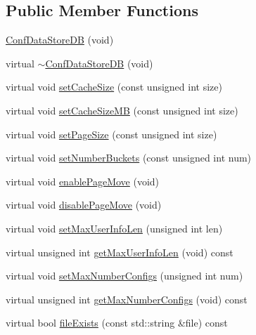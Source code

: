 \subsection*{Public Member Functions}
\begin{DoxyCompactItemize}
\item 
\mbox{\hyperlink{classFILEDB_1_1ConfDataStoreDB_a575d901daeccae08bcda5b2a60681e1b}{Conf\+Data\+Store\+DB}} (void)
\item 
virtual \mbox{\hyperlink{classFILEDB_1_1ConfDataStoreDB_a39b48750dbc9bd0d4ca8c9787edee897}{$\sim$\+Conf\+Data\+Store\+DB}} (void)
\item 
virtual void \mbox{\hyperlink{classFILEDB_1_1ConfDataStoreDB_af432d4a9c6dfb21a6ccb1969343cb4fa}{set\+Cache\+Size}} (const unsigned int size)
\item 
virtual void \mbox{\hyperlink{classFILEDB_1_1ConfDataStoreDB_aa5fafbdd147d1b66d8fcc6821dc3804f}{set\+Cache\+Size\+MB}} (const unsigned int size)
\item 
virtual void \mbox{\hyperlink{classFILEDB_1_1ConfDataStoreDB_a50004cb93881959d0846a12d920a95c8}{set\+Page\+Size}} (const unsigned int size)
\item 
virtual void \mbox{\hyperlink{classFILEDB_1_1ConfDataStoreDB_a20a5d092cdcfbca4dbce15b2da006065}{set\+Number\+Buckets}} (const unsigned int num)
\item 
virtual void \mbox{\hyperlink{classFILEDB_1_1ConfDataStoreDB_ae8f437f44366624ac0d5aba306a5ba42}{enable\+Page\+Move}} (void)
\item 
virtual void \mbox{\hyperlink{classFILEDB_1_1ConfDataStoreDB_afcbba500d85f2a92419193183c428a0f}{disable\+Page\+Move}} (void)
\item 
virtual void \mbox{\hyperlink{classFILEDB_1_1ConfDataStoreDB_a02a2fcc79ba97c11b4ec1ec0321e5415}{set\+Max\+User\+Info\+Len}} (unsigned int len)
\item 
virtual unsigned int \mbox{\hyperlink{classFILEDB_1_1ConfDataStoreDB_a0fc37111156b6c7080ff6a6831c847fc}{get\+Max\+User\+Info\+Len}} (void) const
\item 
virtual void \mbox{\hyperlink{classFILEDB_1_1ConfDataStoreDB_acd6f44fc7a83322417ad1a7ea7d2b6ea}{set\+Max\+Number\+Configs}} (unsigned int num)
\item 
virtual unsigned int \mbox{\hyperlink{classFILEDB_1_1ConfDataStoreDB_a89337b5034d8f87b4a37ceb05ea99d3a}{get\+Max\+Number\+Configs}} (void) const
\item 
virtual bool \mbox{\hyperlink{classFILEDB_1_1ConfDataStoreDB_aec1d15aa66421b99e7cd1151e12d2f17}{file\+Exists}} (const std\+::string \&file) const

\end{DoxyCompactItemize}
